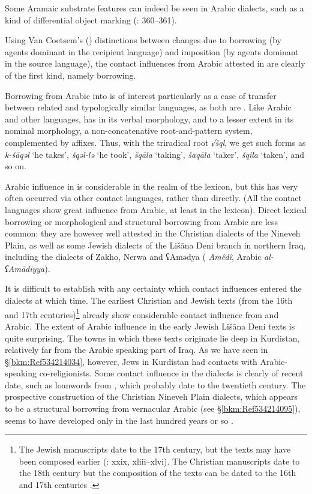 \documentclass[output=paper]{langsci/langscibook}
\begin{document}
Some Aramaic {substrate} features can indeed be seen in  Arabic dialects, such as a kind of {differential object marking} (\citealt{Coghill2014}: 360–361).

Using Van Coetsem’s (\citeyear{VanCoetsem1988,VanCoetsem2000}) distinctions between changes due to borrowing (by agents dominant in the {recipient language}) and {imposition} (by agents dominant in the {source language}), the contact influences from Arabic attested in  are clearly of the first kind, namely borrowing.

Borrowing from Arabic into  is of interest particularly as a case of {transfer} between related and typologically similar languages, as both are . Like Arabic and other  languages,  has in its verbal morphology, and to a lesser extent in its nominal morphology, a {non-concatenative} {root-and-pattern} system, complemented by affixes. Thus, with the triradical {root} \textit{√šql}, we get such forms as \textit{k-šāqəl} ‘he takes’, \textit{šqəl-lə} ‘he took’, \textit{šqāla} ‘taking’, \textit{šaqāla} ‘taker’, \textit{šqila} ‘taken’, and so on.

Arabic influence in  is considerable in the realm of the lexicon, but this has very often occurred via other contact languages, rather than directly. (All the contact languages show great influence from Arabic, at least in the lexicon). Direct lexical borrowing or morphological and structural borrowing from Arabic are less common: they are however well attested in the Christian dialects of the Nineveh Plain, as well as some Jewish dialects of the Lišāna Deni branch in northern Iraq, including the dialects of Zakho, Nerwa and ʕAmədya ( \textit{Amêdî}, Arabic \textit{al\nobreakdash-ʕAmādiyya}).

It is difficult to establish with any certainty which contact influences entered the dialects at which time. The earliest Christian and Jewish  texts (from the 16th and 17th centuries)\footnote{The Jewish manuscripts date to the 17th century, but the texts may have been composed earlier (\citealt{Sabar1976}: xxix, xliii–xlvi). The Christian manuscripts date to the 18th century but the composition of the texts can be dated to the 16th and 17th centuries \citep[16]{Mengozzi2002}.} already show considerable contact influence from  and Arabic. The extent of Arabic influence in the early Jewish Lišāna Deni texts \citep{Sabar1984} is quite surprising. The towns in which these texts originate lie deep in Kurdistan, relatively far from the Arabic speaking part of Iraq. As we have seen in §\ref{bkm:Ref534214034}, however, {Jews} in Kurdistan had contacts with Arabic-speaking co{}-religionists. Some contact influence in the  dialects is clearly of recent date, such as {loanwords} from , which probably date to the twen\-tieth century. The {prospective} construction of the Christian Nineveh Plain dialects, which appears to be a structural borrowing from vernacular Arabic (see §\ref{bkm:Ref534214095}), seems to have developed only in the last hundred years or so \citep[375]{Coghill2010}.
\end{document}
